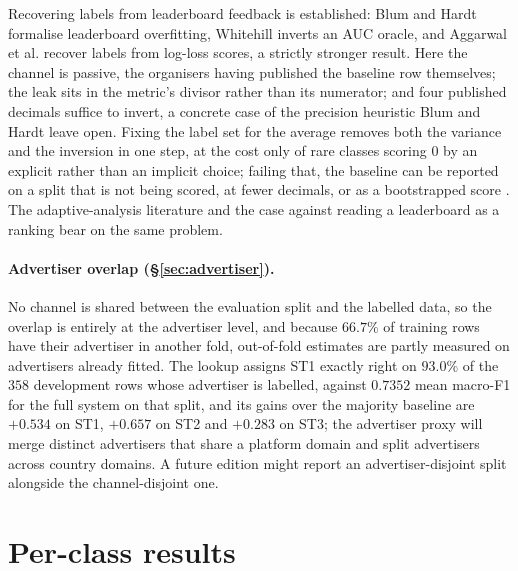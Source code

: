 \documentclass[11pt]{article}
\begin{document}
Recovering labels from leaderboard feedback is established: Blum and Hardt
 formalise leaderboard overfitting, Whitehill 
inverts an AUC oracle, and Aggarwal et al.  recover labels from
log-loss scores, a strictly stronger result. Here the channel is passive, the organisers having
published the baseline row themselves; the leak sits in the metric's divisor rather than its
numerator; and four published decimals suffice to invert, a concrete case of the precision
heuristic Blum and Hardt leave open. Fixing the label set for the average removes both the
variance and the inversion in one step, at the cost only of rare classes scoring $0$ by an
explicit rather than an implicit choice; failing that, the baseline can be reported on a split
that is not being scored, at fewer decimals, or as a bootstrapped score
\cite{chaibubneto2016reducing}. The adaptive-analysis literature
\cite{dwork2015reusable,lin2022msmarco} and the case against reading a leaderboard as a ranking
\cite{ethayarajh2020utility} bear on the same problem.

\paragraph{Advertiser overlap (\S\ref{sec:advertiser}).}
No channel is shared between the evaluation split and the labelled data, so the overlap is
entirely at the advertiser level, and because $66.7\%$ of training rows have their advertiser
in another fold, out-of-fold estimates are partly measured on advertisers already fitted. The
lookup assigns ST1 exactly right on $93.0\%$ of the $358$ development rows whose advertiser is
labelled, against $0.7352$ mean macro-F1 for the full system on that split, and its gains over
the majority baseline are $+0.534$ on ST1, $+0.657$ on ST2 and $+0.283$ on ST3; the advertiser
proxy will merge distinct advertisers that share a platform domain and split advertisers across
country domains. A future edition might report an advertiser-disjoint split
alongside the channel-disjoint one.

\section{Per-class results}
\label{app:perclass}
\end{document}
